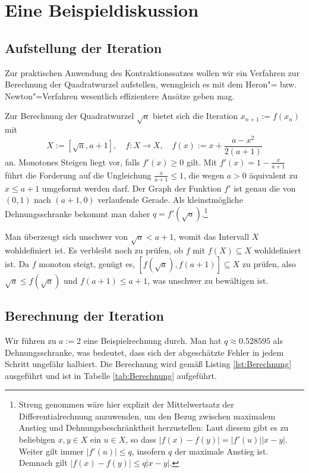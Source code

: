 \documentclass[
  a4paper, 10pt, fleqn, twoside, twocolumn,
  abstract=true
]{scrartcl}
\theoremstyle{plain}
\theoremstyle{definition}
\begin{document}
\section{Eine Beispieldiskussion}

\subsection{Aufstellung der Iteration}

Zur praktischen Anwendung des Kontraktionssatzes wollen wir ein
Verfahren zur Berechnung der Quadratwurzel aufstellen, wenngleich
es mit dem Heron"= bzw. Newton"=Verfahren wesentlich
effizientere Ansätze geben mag.

Zur Berechnung der Quadratwurzel $\sqrt{a}$ bietet sich
die Iteration $x_{n+1} := f(x_n)$ mit
\[X :=[\sqrt{a},a+1],\quad f\colon X\to X, \quad
f(x) := x + \frac{a-x^2}{2(a+1)}\]
an. Monotones Steigen liegt vor, falls $f'(x)\ge 0$ gilt. Mit
$f'(x) = 1 - \frac{x}{a+1}$ führt die Forderung auf die Ungleichung
$\frac{x}{a+1}\le 1$, die wegen $a>0$ äquivalent zu $x\le a+1$ umgeformt
werden darf. Der Graph der Funktion $f'$ ist genau die von $(0,1)$
nach $(a+1,0)$ verlaufende Gerade. Als kleinstmögliche Dehnungsschranke
bekommt man daher $q=f'(\sqrt{a})$.\footnote{Streng genommen wäre hier
explizit der Mittelwertsatz der Differentialrechnung anzuwenden, um den
Bezug zwischen maximalem Anstieg und Dehnungsbeschränktheit herzustellen:
Laut diesem gibt es zu beliebigen $x,y\in X$ ein $u\in X$, so dass
$|f(x)-f(y)| = |f'(u)||x-y|$. Weiter gilt immer $|f'(u)|\le q$, insofern
$q$ der maximale Anstieg ist. Demnach gilt $|f(x)-f(y)| \le q|x-y|$.}

Man überzeugt sich unschwer von $\sqrt{a}<a+1$, womit das Intervall $X$
wohldefiniert ist. Es verbleibt noch zu prüfen, ob $f$ mit $f(X)\subseteq X$
wohldefiniert ist. Da $f$ monoton steigt, genügt es,
$[f(\sqrt{a}),f(a+1)]\subseteq X$ zu prüfen, also $\sqrt{a}\le f(\sqrt{a})$
und $f(a+1)\le a+1$, was unschwer zu bewältigen ist.

\subsection{Berechnung der Iteration}

Wir führen zu $a := 2$ eine Beispielrechnung durch. Man hat
$q\approx 0.528595$ als Dehnungsschranke, was bedeutet, dass sich der
abgeschätzte Fehler in jedem Schritt ungefähr halbiert. Die Berechnung
wird gemäß Listing \ref{lst:Berechnung} ausgeführt und ist in
Tabelle \ref{tab:Berechnung} aufgeführt.
\end{document}

